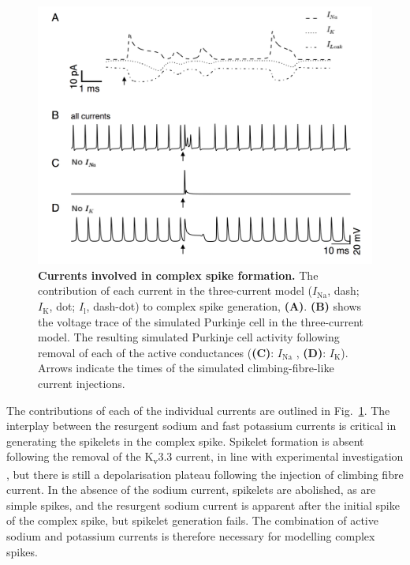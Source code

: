 \documentclass[twocolumn]{svjour3}          %
\renewcommand{\k}{\mathrm{K}}
\newcommand{\na}{\mathrm{Na}}
\newcommand{\leak}{\mathrm{l}}
\begin{document}
\begin{figure}[!ht]
  \includegraphics[width=\linewidth]{Figure3.png}
\caption{\textbf{Currents involved in complex spike formation.} The
contribution of each current in the three-current model ($I_{\na}$,
dash; $I_{\k}$, dot; $I_{\leak}$, dash-dot) to
complex spike generation, \textbf{(A)}. \textbf{(B)} shows the
 voltage trace of the simulated Purkinje cell in the three-current model. The resulting simulated Purkinje cell activity
following removal of each of the active conductances (\textbf{(C)}: $I_{\na}$
, \textbf{(D)}: $I_{\k}$). Arrows
indicate the times of the simulated climbing-fibre-like current
injections.}
\label{currents}
\end{figure}


The contributions of each of the individual currents are outlined in
Fig.~\ref{currents}.  The interplay between the resurgent sodium and
fast potassium currents is critical in generating the spikelets in the
complex spike. Spikelet formation is absent following the removal of
the K\textsubscript{v}3.3 current, in line with experimental
investigation \citep{ZaghaEtAl2010}, but there is still a
depolarisation plateau following the injection of climbing fibre
current. In the absence of the sodium current, spikelets are
abolished, as are simple spikes, and the resurgent sodium current is
apparent after the initial spike of the complex spike, but spikelet
generation fails. The combination of active sodium and potassium
currents is therefore necessary for modelling complex spikes.
\end{document}
